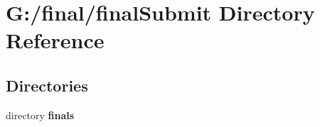 \section{G\-:/final/final\-Submit Directory Reference}
\label{dir_c7305b55a1c8a37fbde63d693a273fcb}
\subsection*{Directories}
\begin{DoxyCompactItemize}
\item 
directory {\bf finals}
\end{DoxyCompactItemize}
